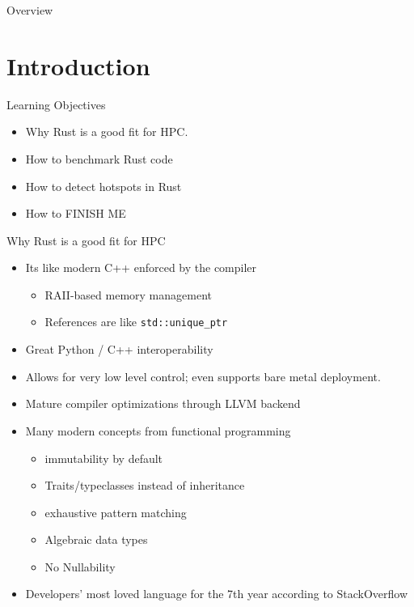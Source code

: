 \documentclass[compress,aspectratio=169]{beamer}
\begin{document}
\begin{frame}[plain]
	\titlepage
\end{frame}

\begin{frame}{Overview}
\tableofcontents
\end{frame}

\section{Introduction}

\begin{frame}{Learning Objectives}
  \begin{itemize}
    \item Why Rust is a good fit for HPC.
    \item How to benchmark Rust code
    \item How to detect hotspots in Rust
    \item How to FINISH ME
  \end{itemize}
\end{frame}

\begin{frame}{Why Rust is a good fit for HPC}
  \begin{itemize}
    \item Its like modern C++ enforced by the compiler
      \begin{itemize}
        \item RAII-based memory management
        \item References are like \texttt{std::unique\_ptr}
      \end{itemize}
    \item Great Python / C++ interoperability
    \item Allows for very low level control; even supports bare metal deployment.
    \item Mature compiler optimizations through LLVM backend
    \item Many modern concepts from functional programming
      \begin{itemize}
        \item immutability by default
        \item Traits/typeclasses instead of inheritance
        \item exhaustive pattern matching
        \item Algebraic data types
        \item No Nullability
      \end{itemize}
      \item Developers' most loved language for the 7th year according to StackOverflow \cite{sosurvey}
  \end{itemize}
\end{frame}
\end{document}
